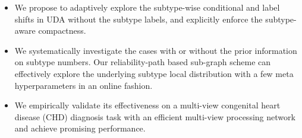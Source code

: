 \begin{itemize}
    \item We propose to adaptively explore the subtype-wise conditional and label shifts in UDA without the subtype labels, and explicitly enforce the subtype-aware compactness.
    
    \item We systematically investigate the cases with or without the prior information on subtype numbers. Our reliability-path based sub-graph scheme can effectively explore the underlying subtype local distribution with a few meta hyperparameters in an online fashion.
    
    \item  We empirically validate its effectiveness on a multi-view congenital heart disease (CHD) diagnosis task with an efficient multi-view processing network and achieve promising performance.
    
    
\end{itemize}

 